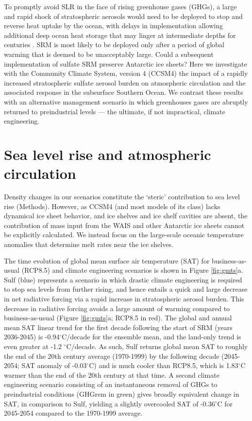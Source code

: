 \documentclass{nature}
\begin{document}
To promptly avoid SLR in the face of rising greenhouse gases (GHGs), a large and rapid shock of stratospheric aerosols would need to be deployed to stop and reverse heat uptake by the ocean, with delays in implementation allowing additional deep ocean heat storage that may linger at intermediate depths for centuries \cite{gillett11}. SRM is most likely to be deployed only after a period of global warming that is deemed to be unacceptably large. Could a subsequent implementation of sulfate SRM preserve Antarctic ice sheets? Here we investigate with the Community Climate System, version 4 (CCSM4) the impact of a rapidly increased stratospheric sulfate aerosol burden on atmospheric circulation and the associated response in the subsurface Southern Ocean. We contrast these results with an alternative management scenario in which greenhouses gases are abruptly returned to preindustrial levels --- the ultimate, if not impractical, climate engineering.  

\section{Sea level rise and atmospheric circulation}

Density changes in our scenarios constitute the `steric' contribution to sea level rise (Methods). However, as CCSM4 (and most models of its class) lacks dynamical ice sheet behavior, and ice shelves and ice shelf cavities are absent, the contribution of mass input from the WAIS and other Antarctic ice sheets cannot be explicitly calculated. We instead focus on the large-scale oceanic temperature anomalies that determine melt rates near the ice shelves. 

The time evolution of global mean surface air temperature (SAT) for business-as-usual (RCP8.5) and climate engineering scenarios is shown in Figure \ref{fig:gmts}a. Sulf (blue) represents a scenario in which drastic climate engineering is required to stop sea levels from further rising, and hence entails a quick and large decrease in net radiative forcing via a rapid increase in stratospheric aerosol burden. This decrease in radiative forcing avoids a large amount of warming compared to business-as-usual (Figure \ref{fig:gmts}a; RCP8.5 in red). The global and annual mean SAT linear trend for the first decade following the start of SRM (years 2036-2045) is -0.94$^\circ$C/decade for the ensemble mean, and the land-only trend is even greater at -1.2 $^\circ$C/decade. As such, Sulf returns global mean SAT to roughly the end of the 20th century average (1970-1999) by the following decade (2045-2054; SAT anomaly of -0.03$^\circ$C) and is much cooler than RCP8.5, which is 1.83$^\circ$C warmer than the end of the 20th century at that time. A second climate engineering scenario consisting of an instantaneous removal of GHGs to preindustrial conditions (GHGrem in green) gives broadly equivalent change in SAT, in comparison to Sulf, yielding a slightly overcooled SAT of -0.36$^\circ$C for 2045-2054 compared to the 1970-1999 average. 
\end{document}
